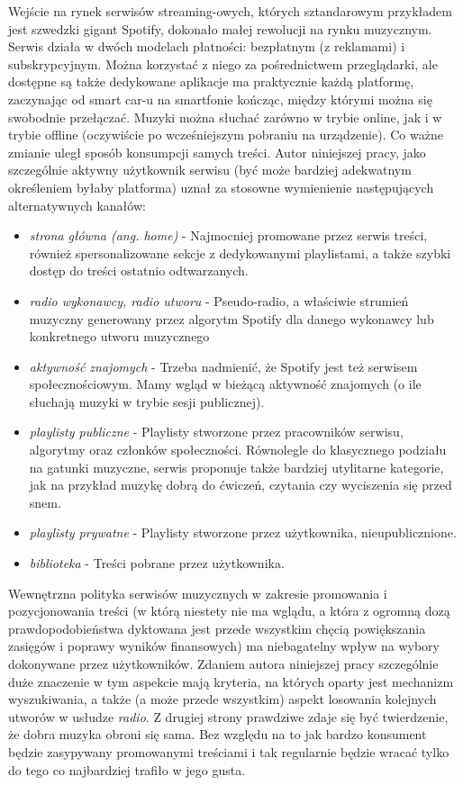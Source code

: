 \documentclass[a4paper,11pt]{article}
\begin{document}
    Wejście na rynek serwisów streaming-owych, których sztandarowym przykładem jest szwedzki gigant Spotify, dokonało małej rewolucji na rynku muzycznym. Serwis działa w dwóch modelach płatności: bezpłatnym (z reklamami) i subskrypcyjnym. Można korzystać z niego za pośrednictwem przeglądarki, ale dostępne są także dedykowane aplikacje ma praktycznie każdą platformę, zaczynając od smart car-u na smartfonie kończąc, między którymi można się swobodnie przełączać. Muzyki można słuchać zarówno w trybie online, jak i w trybie offline (oczywiście po wcześniejszym pobraniu na urządzenie). Co ważne zmianie uległ sposób konsumpcji samych treści. Autor niniejszej pracy, jako szczególnie aktywny użytkownik serwisu (być może bardziej adekwatnym określeniem byłaby platforma) uznał za stosowne wymienienie następujących alternatywnych kanałów:
    \begin{itemize}
        \item \textit{strona główna (ang. home)} - Najmocniej promowane przez serwis treści, również spersonalizowane sekcje z dedykowanymi playlistami, a także szybki dostęp do treści ostatnio odtwarzanych.
        \item \textit{radio wykonawcy, radio utworu} - Pseudo-radio, a właściwie strumień muzyczny generowany przez algorytm Spotify dla danego wykonawcy lub konkretnego utworu muzycznego
        \item \textit{aktywność znajomych} - Trzeba nadmienić, że Spotify jest też serwisem społecznościowym. Mamy wgląd w bieżącą aktywność znajomych (o ile słuchają muzyki w trybie sesji publicznej).
        \item \textit{playlisty publiczne} - Playlisty stworzone przez pracowników serwisu, algorytmy oraz członków społeczności. Równolegle do klasycznego podziału na gatunki muzyczne, serwis proponuje także bardziej utylitarne kategorie, jak na przykład muzykę dobrą do ćwiczeń, czytania czy wyciszenia się przed snem.
        \item \textit{playlisty prywatne} - Playlisty stworzone przez użytkownika, nieupublicznione.
        \item \textit{biblioteka} - Treści pobrane przez użytkownika.
    \end{itemize}

    \bigskip

    Wewnętrzna polityka serwisów muzycznych w zakresie promowania i pozycjonowania treści (w którą niestety nie ma wglądu, a która z ogromną dozą prawdopodobieństwa dyktowana jest przede wszystkim chęcią powiększania zasięgów i poprawy wyników finansowych) ma niebagatelny wpływ na wybory dokonywane przez użytkowników\cite{PreferencjeMuzyczneWCzasachSteamingu2020}. Zdaniem autora niniejszej pracy szczególnie duże znaczenie w tym aspekcie mają kryteria, na których oparty jest mechanizm wyszukiwania, a także (a może przede wszystkim) aspekt losowania kolejnych utworów w usłudze \textit{radio}. Z drugiej strony prawdziwe zdaje się być twierdzenie, że dobra muzyka obroni się sama. Bez względu na to jak bardzo konsument będzie zasypywany promowanymi treściami i tak regularnie będzie wracać tylko do tego co najbardziej trafiło w jego gusta.
\end{document}
